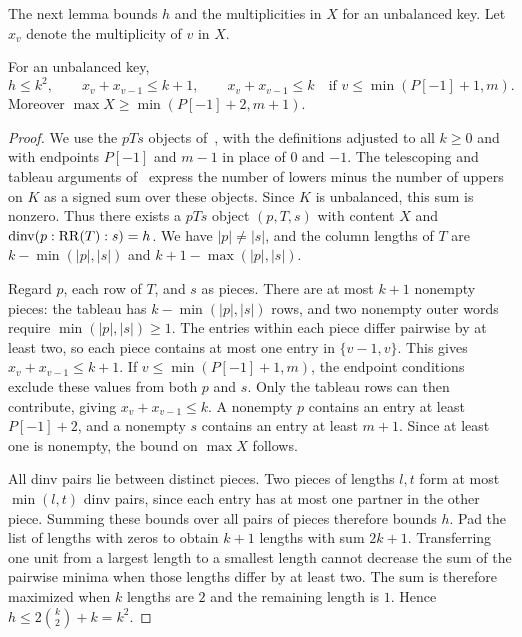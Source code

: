 \documentclass[11pt]{article}
\begin{document}
The next lemma bounds $h$ and the multiplicities in $X$ for an unbalanced key. Let $x_v$ denote the multiplicity of $v$ in $X$.
\begin{lemma}\label{bounds}
For an unbalanced key,
\[
 h\le k^2,\qquad x_v+x_{v-1}\le k+1,\qquad
 x_v+x_{v-1}\le k\quad\text{if }v\le\min(P[-1]+1,m).
\]
Moreover $\max X\ge\min(P[-1]+2,m+1)$.
\end{lemma}
\begin{proof}
We use the $pTs$ objects of~\cite[\S3.3]{H}, with the definitions adjusted to all $k\ge0$ and with endpoints $P[-1]$ and $m-1$ in place of $0$ and $-1$. The telescoping and tableau arguments of~\cite[\S3.2, Lemma~3.4, and Corollary~3.5]{H} express the number of lowers minus the number of uppers on $K$ as a signed sum over these objects. Since $K$ is unbalanced, this sum is nonzero. Thus there exists a $pTs$ object $(p,T,s)$ with content $X$ and $\operatorname{dinv}(p:\mathrm{RR}(T):s)=h$. We have $|p|\ne|s|$, and the column lengths of $T$ are $k-\min(|p|,|s|)$ and $k+1-\max(|p|,|s|)$.

Regard $p$, each row of $T$, and $s$ as pieces. There are at most $k+1$ nonempty pieces: the tableau has $k-\min(|p|,|s|)$ rows, and two nonempty outer words require $\min(|p|,|s|)\ge1$. The entries within each piece differ pairwise by at least two, so each piece contains at most one entry in $\{v-1,v\}$. This gives $x_v+x_{v-1}\le k+1$. If $v\le\min(P[-1]+1,m)$, the endpoint conditions exclude these values from both $p$ and $s$. Only the tableau rows can then contribute, giving $x_v+x_{v-1}\le k$. A nonempty $p$ contains an entry at least $P[-1]+2$, and a nonempty $s$ contains an entry at least $m+1$. Since at least one is nonempty, the bound on $\max X$ follows.

All dinv pairs lie between distinct pieces. Two pieces of lengths $l,t$ form at most $\min(l,t)$ dinv pairs, since each entry has at most one partner in the other piece. Summing these bounds over all pairs of pieces therefore bounds $h$. Pad the list of lengths with zeros to obtain $k+1$ lengths with sum $2k+1$. Transferring one unit from a largest length to a smallest length cannot decrease the sum of the pairwise minima when those lengths differ by at least two. The sum is therefore maximized when $k$ lengths are $2$ and the remaining length is $1$. Hence $h\le2\binom k2+k=k^2$.
\end{proof}
\end{document}
